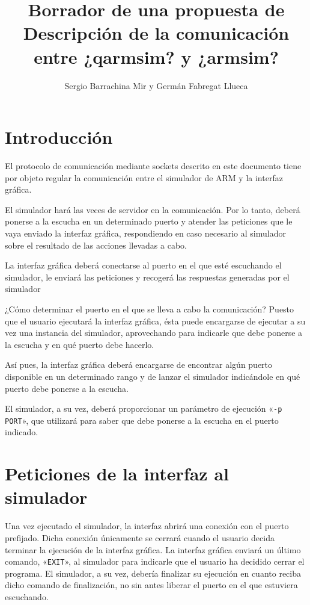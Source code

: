 \documentclass[notitlepage,11pt,a4paper,final,twoside]{article}
\title{Borrador de una propuesta de \\
  Descripción de la comunicación entre ¿qarmsim? y ¿armsim?}
\author{Sergio Barrachina Mir y Germán Fabregat Llueca}
\begin{document}
\maketitle{}

\tableofcontents

\section{Introducción}

El protocolo de comunicación mediante sockets descrito en este
documento tiene por objeto regular la comunicación entre el simulador
de ARM y la interfaz gráfica.

El simulador hará las veces de servidor en la comunicación. Por lo
tanto, deberá ponerse a la escucha en un determinado puerto y atender
las peticiones que le vaya enviado la interfaz gráfica, respondiendo
en caso necesario al simulador sobre el resultado de las acciones
llevadas a cabo.

La interfaz gráfica deberá conectarse al puerto en el que esté
escuchando el simulador, le enviará las peticiones y recogerá las
respuestas generadas por el simulador

¿Cómo determinar el puerto en el que se lleva a cabo la comunicación?
Puesto que el usuario ejecutará la interfaz gráfica, ésta puede
encargarse de ejecutar a su vez una instancia del simulador,
aprovechando para indicarle que debe ponerse a la escucha y en qué
puerto debe hacerlo.

Así pues, la interfaz gráfica deberá encargarse de encontrar algún
puerto disponible en un determinado rango y de lanzar el simulador
indicándole en qué puerto debe ponerse a la escucha.

El simulador, a su vez, deberá proporcionar un parámetro de ejecución
«\verb+-p PORT+», que utilizará para saber que debe ponerse a la
escucha en el puerto indicado.


\section{Peticiones de la interfaz al simulador}

Una vez ejecutado el simulador, la interfaz abrirá una conexión con el
puerto prefijado. Dicha conexión únicamente se cerrará cuando el
usuario decida terminar la ejecución de la interfaz gráfica. La
interfaz gráfica enviará un último comando, «\texttt{EXIT}», al
simulador para indicarle que el usuario ha decidido cerrar el
programa. El simulador, a su vez, debería finalizar su ejecución en
cuanto reciba dicho comando de finalización, no sin antes liberar el
puerto en el que estuviera escuchando.
\end{document}

